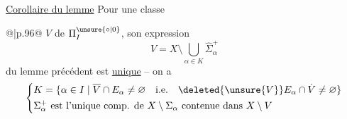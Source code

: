 \uline{Corollaire du lemme} Pour une classe

\noindent\begin{tabular}{@{}|p{.96\linewidth}@{}}
$V$ de $\Pi_I^{\unsure{\circ|0}}$, son expression
\[
V=X\setminus\bigcup_{\alpha\in K}\widehat{\Sigma}_\alpha^+
\]
du lemme précédent est \uline{unique} -- on a
{\small
\[
\left\{\begin{aligned}
&K=\{\alpha\in I\mid\overline V\cap E_\alpha\ne\varnothing\quad\text{i.e.}\quad\deleted{\unsure{V}}E_\alpha\cap\dot V\ne\varnothing\}\\
&\Sigma_\alpha^+\ \text{est l'unique comp. de }X\setminus\Sigma_\alpha\ \text{contenue dans }X\setminus V
\end{aligned}\right.
\]}
\end{tabular}
